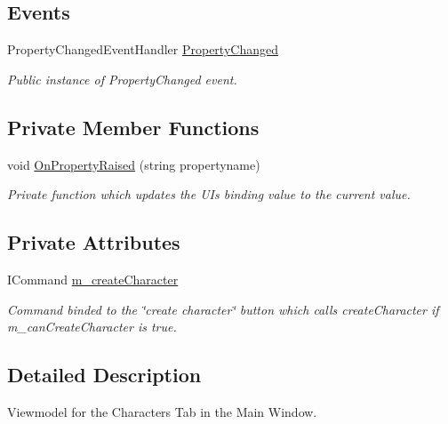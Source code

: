 \subsection*{Events}
\begin{DoxyCompactItemize}
\item 
Property\+Changed\+Event\+Handler \mbox{\hyperlink{class_dungeons__n___dragons___manager_1_1_viewmodels_1_1_characters_tab_viewmodel_a6675b3bc821619ffe7f4ad20be8df240}{Property\+Changed}}
\begin{DoxyCompactList}\small\item\em Public instance of Property\+Changed event. \end{DoxyCompactList}\end{DoxyCompactItemize}
\subsection*{Private Member Functions}
\begin{DoxyCompactItemize}
\item 
void \mbox{\hyperlink{class_dungeons__n___dragons___manager_1_1_viewmodels_1_1_characters_tab_viewmodel_aebf6ce070fbb447adb5dbc456051d706}{On\+Property\+Raised}} (string propertyname)
\begin{DoxyCompactList}\small\item\em Private function which updates the UI\textquotesingle{}s binding value to the current value. \end{DoxyCompactList}\end{DoxyCompactItemize}
\subsection*{Private Attributes}
\begin{DoxyCompactItemize}
\item 
I\+Command \mbox{\hyperlink{class_dungeons__n___dragons___manager_1_1_viewmodels_1_1_characters_tab_viewmodel_a5b3939393a4945c956ff11e765cc30ff}{m\+\_\+create\+Character}}
\begin{DoxyCompactList}\small\item\em Command binded to the \char`\"{}create character\char`\"{} button which calls create\+Character if m\+\_\+can\+Create\+Character is true. \end{DoxyCompactList}\end{DoxyCompactItemize}


\subsection{Detailed Description}
Viewmodel for the Characters Tab in the Main Window. 



